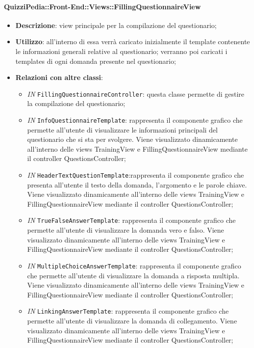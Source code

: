 \paragraph{QuizziPedia::Front-End::Views::FillingQuestionnaireView}
\begin{itemize}
	\item \textbf{Descrizione}: view principale per la compilazione del questionario;
	\item \textbf{Utilizzo}: all'interno di essa verrà caricato inizialmente il template contenente le informazioni generali relative al questionario; verranno poi caricati i templates di ogni domanda presente nel questionario;
	\item \textbf{Relazioni con altre classi}: 
	\begin{itemize}
		\item \textit{IN} \texttt{FillingQuestionnaireController}: questa classe permette di gestire la compilazione del questionario;
		\item \textit{IN} \texttt{InfoQuestionnaireTemplate}: rappresenta il componente grafico che permette all'utente di visualizzare le informazioni principali del questionario che si sta per svolgere. Viene visualizzato dinamicamente all'interno delle views TrainingView e FillingQuestionnaireView mediante il controller QuestionsController;
		\item \textit{IN} \texttt{HeaderTextQuestionTemplate}:rappresenta il componente grafico che presenta all'utente il testo della domanda, l'argomento e le parole chiave. Viene visualizzato dinamicamente all'interno delle views TrainingView e FillingQuestionnaireView mediante il controller QuestionsController;
		\item \textit{IN} \texttt{TrueFalseAnswerTemplate}: rappresenta il componente grafico che permette all'utente di visualizzare la domanda vero e falso. Viene visualizzato dinamicamente all'interno delle views TrainingView e FillingQuestionnaireView mediante il controller QuestionsController;
		\item \textit{IN} \texttt{MultipleChoiceAnswerTemplate}: rappresenta il componente grafico che permette all'utente di visualizzare la domanda a risposta multipla. Viene visualizzato dinamicamente all'interno delle views TrainingView e FillingQuestionnaireView mediante il controller QuestionsController;
		\item \textit{IN} \texttt{LinkingAnswerTemplate}: rappresenta il componente grafico che permette all'utente di visualizzare la domanda di collegamento. Viene visualizzato dinamicamente all'interno delle views TrainingView e FillingQuestionnaireView mediante il controller QuestionsController;

\end{itemize}
\end{itemize}
